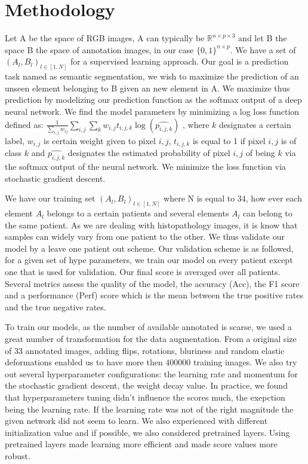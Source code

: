 \documentclass{article}
\begin{document}
\section{Methodology}
\label{sec:method}
Let A be the space of RGB images, A can typically be 
$\mathbb{R}^{n \times p \times 3}$ and let B the space B the space of annotation 
images, in our case $\{0,1\}^{n \times p}$. We have a set of 
$(A_l,B_l)_{l \in [1, N]}$ for a supervised learning approach. Our goal is 
a prediction task 
named as semantic segmentation, we wish to maximize the prediction of 
an unseen element belonging to B given an new element in A. We maximize 
thus prediction by modelizing our prediction function as the softmax output of a deep neural 
network. We find the model parameters by minimizing a log loss function 
defined as:
 $\frac{1}{\sum_{i,j}w_{ij}} \sum_{i,j} \sum_k w_{i,j} t_{i,j,k} \log (\widehat{p_{i,j,k}})$
, where $k$ designates a certain label, $w_{i,j}$ is 
certain weight given to pixel $i,j$, $t_{i,j,k}$ is equal to 1 if pixel $i,j$ is 
of class $k$ and $\widehat{p_{i,j,k}}$ designates the estimated probability 
of pixel $i,j$ of being $k$ via the softmax output of the neural network.
We minimize the loss function via stochastic gradient descent.

We have our training set $(A_l,B_l)_{l \in [1, N]}$ where N is equal to 
34, how ever each element $A_l$ belongs to a certain patients and 
several elements $A_l$ can belong to the same patient. As we are 
dealing with histopathology images, it is know that samples can widely 
vary from one patient to the other. We thus validate our model by a 
leave one patient out scheme. Our validation scheme is as followed, for a 
given set of hype parameters, we 
train our model on every patient except one that is used for validation. 
Our final score is averaged over all patients.
Several metrics assess the quality of the model, the accuracy (Acc), the 
F1 score and a performance (Perf) score which is the mean between the 
true positive rates and the true negative rates.

To train our models, as the number of available annotated is scarse, we 
used a great number of transformation for the data augmentation. From 
a original size of 33 annotated images, adding flips, rotations, bluriness 
and random elastic deformations enabled us to have more then 
$400 000$ training images. 
We also try out several hyperparameter configurations: the learning rate and 
momentum for the stochastic gradient descent, the weight decay value.  
In practice, we found that hyperparameters tuning didn't influence the 
scores much, the exepction being the learning rate. If the learning rate 
was not of the right magnitude the given network did not seem to learn. 
We also experienced with different 
initialization value and if possible, we also considered pretrained layers. 
Using pretrained layers made learning more efficient and made score 
values more robust.
\end{document}
